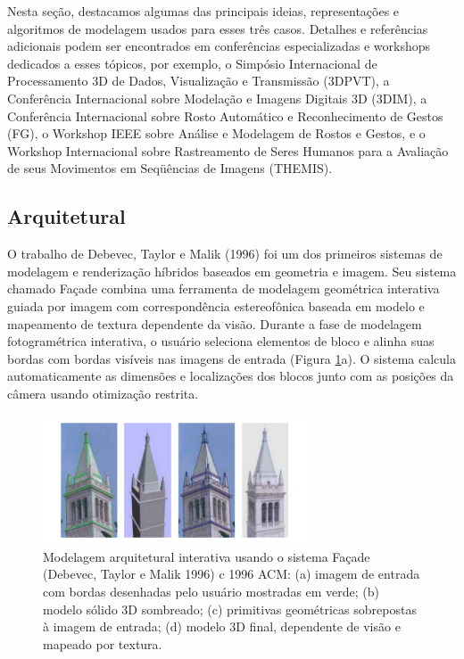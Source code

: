 \documentclass{article}
\begin{document}
Nesta seção, destacamos algumas das principais ideias, representações e algoritmos de modelagem usados para esses três casos. Detalhes e referências adicionais podem ser encontrados em conferências especializadas e workshops dedicados a esses tópicos, por exemplo, o Simpósio Internacional de Processamento 3D de Dados, Visualização e Transmissão (3DPVT), a Conferência Internacional sobre Modelação e Imagens Digitais 3D (3DIM), a Conferência Internacional sobre Rosto Automático e Reconhecimento de Gestos (FG), o Workshop IEEE sobre Análise e Modelagem de Rostos e Gestos, e o Workshop Internacional sobre Rastreamento de Seres Humanos para a Avaliação de seus Movimentos em Seqüências de Imagens (THEMIS).

\subsection{Arquitetural}
\label{subsec:Arquitetural}
O trabalho de Debevec, Taylor e Malik (1996)\cite{Debevec:1996:MRA:237170.237191} foi um dos primeiros sistemas de modelagem e renderização híbridos baseados em geometria e imagem. Seu sistema chamado Façade combina uma ferramenta de modelagem geométrica interativa guiada por imagem com correspondência estereofônica baseada em modelo e mapeamento de textura dependente da visão. Durante a fase de modelagem fotogramétrica interativa, o usuário seleciona elementos de bloco e alinha suas bordas com bordas visíveis nas imagens de entrada (Figura \ref{fig:img1}a). O sistema calcula automaticamente as dimensões e localizações dos blocos junto com as posições da câmera usando otimização restrita.

\begin{figure}[!htb]
    \centering
    \includegraphics[width=0.7\textwidth]{img1.png}
    \caption{Modelagem arquitetural interativa usando o sistema Façade (Debevec, Taylor e Malik 1996) c 1996 ACM: (a) imagem de entrada com bordas desenhadas pelo usuário mostradas em verde; (b) modelo sólido 3D sombreado; (c) primitivas geométricas sobrepostas à imagem de entrada; (d) modelo 3D final, dependente de visão e mapeado por textura.}
    \label{fig:img1}
\end{figure}
\end{document}
